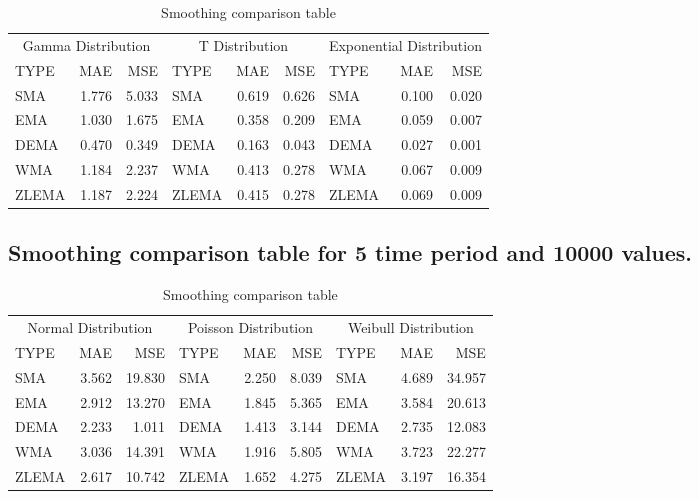 \documentclass{article}
\begin{document}
\begin{table}[H]

\caption{\label{tab:unnamed-chunk-10}Smoothing comparison table}
\centering
\begin{tabular}[t]{lrrlrrlrr}
\toprule
\multicolumn{3}{c}{Gamma Distribution} & \multicolumn{3}{c}{T Distribution} & \multicolumn{3}{c}{Exponential Distribution} \\
\cmidrule(l{3pt}r{3pt}){1-3} \cmidrule(l{3pt}r{3pt}){4-6} \cmidrule(l{3pt}r{3pt}){7-9}
TYPE & MAE & MSE & TYPE & MAE & MSE & TYPE & MAE & MSE\\
\midrule
SMA & 1.776 & 5.033 & SMA & 0.619 & 0.626 & SMA & 0.100 & 0.020\\
EMA & 1.030 & 1.675 & EMA & 0.358 & 0.209 & EMA & 0.059 & 0.007\\
DEMA & 0.470 & 0.349 & DEMA & 0.163 & 0.043 & DEMA & 0.027 & 0.001\\
WMA & 1.184 & 2.237 & WMA & 0.413 & 0.278 & WMA & 0.067 & 0.009\\
ZLEMA & 1.187 & 2.224 & ZLEMA & 0.415 & 0.278 & ZLEMA & 0.069 & 0.009\\
\bottomrule
\end{tabular}
\end{table}

\hypertarget{smoothing-comparison-table-for-5-time-period-and-10000-values.}{%
\subsection{Smoothing comparison table for 5 time period and 10000
values.}\label{smoothing-comparison-table-for-5-time-period-and-10000-values.}}

\begin{table}[H]

\caption{\label{tab:unnamed-chunk-12}Smoothing comparison table}
\centering
\begin{tabular}[t]{lrrlrrlrr}
\toprule
\multicolumn{3}{c}{Normal Distribution} & \multicolumn{3}{c}{Poisson Distribution} & \multicolumn{3}{c}{Weibull Distribution} \\
\cmidrule(l{3pt}r{3pt}){1-3} \cmidrule(l{3pt}r{3pt}){4-6} \cmidrule(l{3pt}r{3pt}){7-9}
TYPE & MAE & MSE & TYPE & MAE & MSE & TYPE & MAE & MSE\\
\midrule
SMA & 3.562 & 19.830 & SMA & 2.250 & 8.039 & SMA & 4.689 & 34.957\\
EMA & 2.912 & 13.270 & EMA & 1.845 & 5.365 & EMA & 3.584 & 20.613\\
DEMA & 2.233 & 1.011 & DEMA & 1.413 & 3.144 & DEMA & 2.735 & 12.083\\
WMA & 3.036 & 14.391 & WMA & 1.916 & 5.805 & WMA & 3.723 & 22.277\\
ZLEMA & 2.617 & 10.742 & ZLEMA & 1.652 & 4.275 & ZLEMA & 3.197 & 16.354\\
\bottomrule
\end{tabular}
\end{table}
\end{document}
